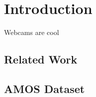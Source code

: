 \chapter{Introduction}
\label{cpt:intro}

Webcams are cool

\section{Related Work}

\section{AMOS Dataset}

